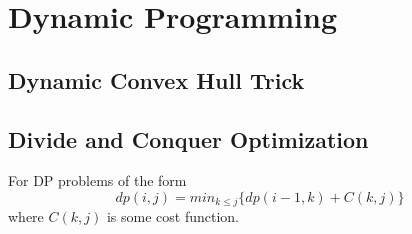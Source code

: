 \section{Dynamic Programming}
  \subsection{Dynamic Convex Hull Trick}
  \subsection{Divide and Conquer Optimization}
    For DP problems of the form $$dp(i,j) = min_{k \leq j} \{dp(i-1,k)+C(k,j)\}$$ where $C(k,j)$ is some cost function.
